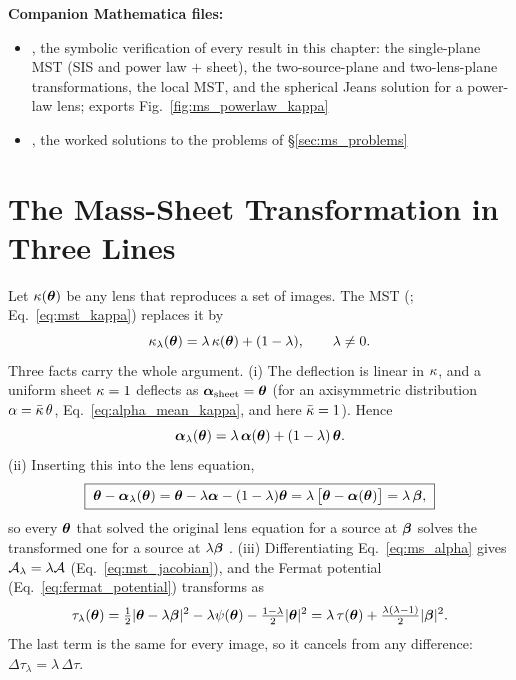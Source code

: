 \medskip
\noindent
\textbf{Companion Mathematica files:}
\begin{itemize}[nosep]
    \item {},
          the symbolic verification of every result in this chapter: the
          single-plane MST (SIS and power law $+$ sheet), the two-source-plane
          and two-lens-plane transformations, the local MST, and the spherical
          Jeans solution for a power-law lens; exports
          Fig.~\ref{fig:ms_powerlaw_kappa}
    \item {},
          the worked solutions to the problems of \S\ref{sec:ms_problems}
\end{itemize}


\section{The Mass-Sheet Transformation in Three Lines}
\label{sec:ms_three_lines}

Let $\kappa(\boldsymbol{\theta})$ be any lens that reproduces a set of images.  The
MST (\citealp{falco_gorenstein_shapiro_1985}; Eq.~\ref{eq:mst_kappa})
replaces it by
\begin{equation}
    \kappa_\lambda(\boldsymbol{\theta}) = \lambda\,\kappa(\boldsymbol{\theta}) + (1-\lambda),
    \qquad \lambda\neq0 .
    \label{eq:ms_mst}
\end{equation}
Three facts carry the whole argument.  (i) The deflection is linear in
$\kappa$, and a uniform sheet $\kappa=1$ deflects as
$\boldsymbol{\alpha}_{\rm sheet}=\boldsymbol{\theta}$ (for an axisymmetric distribution
$\alpha=\bar{\kappa}\,\theta$, Eq.~\ref{eq:alpha_mean_kappa}, and here
$\bar{\kappa}=1$).  Hence
\begin{equation}
    \boldsymbol{\alpha}_\lambda(\boldsymbol{\theta})=\lambda\,\boldsymbol{\alpha}(\boldsymbol{\theta})+(1-\lambda)\,\boldsymbol{\theta} .
    \label{eq:ms_alpha}
\end{equation}
(ii) Inserting this into the lens equation,
\begin{equation}
    \boxed{\;
    \boldsymbol{\theta}-\boldsymbol{\alpha}_\lambda(\boldsymbol{\theta})
    =\boldsymbol{\theta}-\lambda\boldsymbol{\alpha}-(1-\lambda)\boldsymbol{\theta}
    =\lambda\,\bigl[\boldsymbol{\theta}-\boldsymbol{\alpha}(\boldsymbol{\theta})\bigr]
    =\lambda\,\boldsymbol{\beta} ,\;}
    \label{eq:ms_three_lines}
\end{equation}
so every $\boldsymbol{\theta}$ that solved the original lens equation for a source at
$\boldsymbol{\beta}$ solves the transformed one for a source at $\lambda\boldsymbol{\beta}$
.
(iii) Differentiating Eq.~\eqref{eq:ms_alpha} gives
$\mathcal{A}_\lambda=\lambda\mathcal{A}$ (Eq.~\ref{eq:mst_jacobian}), and the Fermat
potential (Eq.~\ref{eq:fermat_potential}) transforms as
\begin{equation}
    \tau_\lambda(\boldsymbol{\theta})=\tfrac12|\boldsymbol{\theta}-\lambda\boldsymbol{\beta}|^2
      -\lambda\psi(\boldsymbol{\theta})-\tfrac{1-\lambda}{2}|\boldsymbol{\theta}|^2
    =\lambda\,\tau(\boldsymbol{\theta})+\tfrac{\lambda(\lambda-1)}{2}|\boldsymbol{\beta}|^2 .
    \label{eq:ms_fermat}
\end{equation}
The last term is the same for every image, so it cancels from any difference:
$\Delta\tau_\lambda=\lambda\,\Delta\tau$.


